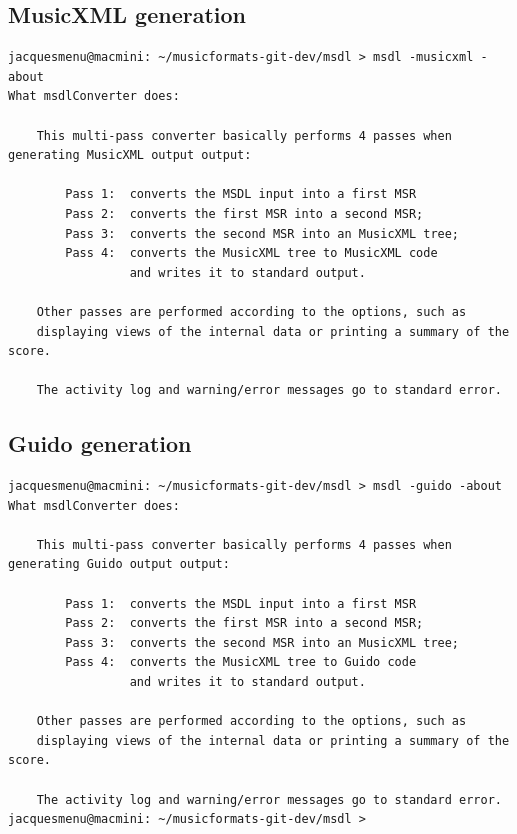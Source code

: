 \subsection{MusicXML generation}

\begin{lstlisting}[language=Terminal]
jacquesmenu@macmini: ~/musicformats-git-dev/msdl > msdl -musicxml -about
What msdlConverter does:

    This multi-pass converter basically performs 4 passes when generating MusicXML output output:

        Pass 1:  converts the MSDL input into a first MSR
        Pass 2:  converts the first MSR into a second MSR;
        Pass 3:  converts the second MSR into an MusicXML tree;
        Pass 4:  converts the MusicXML tree to MusicXML code
                 and writes it to standard output.

    Other passes are performed according to the options, such as
    displaying views of the internal data or printing a summary of the score.

    The activity log and warning/error messages go to standard error.

\end{lstlisting}

\subsection{Guido generation}

\begin{lstlisting}[language=Terminal]
jacquesmenu@macmini: ~/musicformats-git-dev/msdl > msdl -guido -about
What msdlConverter does:

    This multi-pass converter basically performs 4 passes when generating Guido output output:

        Pass 1:  converts the MSDL input into a first MSR
        Pass 2:  converts the first MSR into a second MSR;
        Pass 3:  converts the second MSR into an MusicXML tree;
        Pass 4:  converts the MusicXML tree to Guido code
                 and writes it to standard output.

    Other passes are performed according to the options, such as
    displaying views of the internal data or printing a summary of the score.

    The activity log and warning/error messages go to standard error.
jacquesmenu@macmini: ~/musicformats-git-dev/msdl >

\end{lstlisting}

